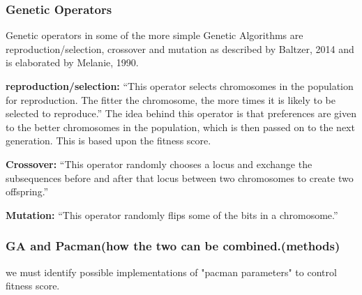 \subsubsection{Genetic Operators}
Genetic operators in some of the more simple Genetic Algorithms are reproduction/selection, crossover and mutation as described by Baltzer, 2014 and is elaborated by Melanie, 1990. \cite{Melanie1990}

\textbf{reproduction/selection:} \enquote{This operator selects chromosomes in the population for reproduction. The fitter the chromosome, the more times it is likely to be selected to reproduce.} \cite[pp. 8]{Melanie1990}
The idea behind this operator is that preferences are given to the better chromosomes in the population, which is then passed on to the next generation. This is based upon the fitness score.


\textbf{Crossover:} \enquote{This operator randomly chooses a locus and exchange the subsequences before and after that locus between two chromosomes to create two offspring.} \cite[pp. 8]{Melanie1990}


\textbf{Mutation:} \enquote{This operator randomly flips some of the bits in a chromosome.} \cite[pp. 8]{Melanie1990}




\subsubsection{GA and Pacman(how the two can be combined.(methods)}
we must identify possible implementations of "pacman parameters" to control fitness score.
